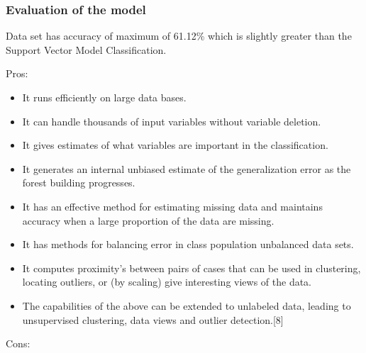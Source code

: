 \documentclass{article}
\begin{document}
\subsubsection{Evaluation of the model}
Data set has accuracy of maximum of 61.12\% which is slightly greater than the Support Vector Model Classification.\newline

Pros:
\begin{itemize}
\item It runs efficiently on large data bases.
\item It can handle thousands of input variables without variable deletion.
\item It gives estimates of what variables are important in the classification.
\item It generates an internal unbiased estimate of the generalization error as the forest building progresses.
\item It has an effective method for estimating missing data and maintains accuracy when a large proportion of the data are missing.
\item It has methods for balancing error in class population unbalanced data sets.
\item It computes proximity's between pairs of cases that can be used in clustering, locating outliers, or (by scaling) give interesting views of the data.
\item The capabilities of the above can be extended to unlabeled data, leading to unsupervised clustering, data views and outlier detection.[8]

\end{itemize}
Cons:
\end{document}
